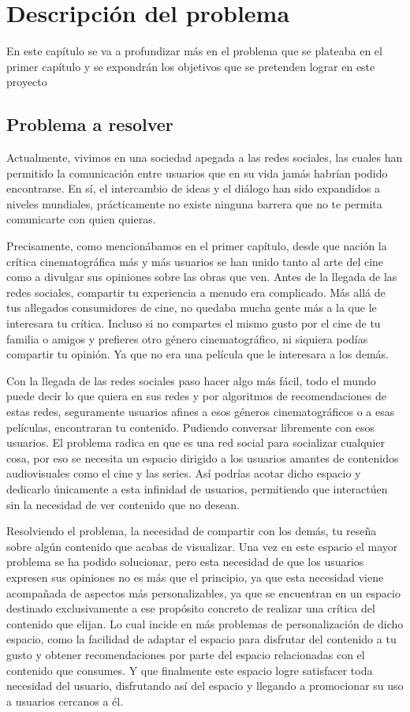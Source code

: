 \chapter{Descripción del problema}

En este capítulo se va a profundizar más en el problema que se plateaba en el primer capítulo y se expondrán los objetivos que se pretenden lograr en este proyecto

\section{Problema a resolver}
Actualmente, vivimos en una sociedad apegada a las redes sociales, las cuales han permitido la comunicación entre usuarios que en su vida jamás habrían podido encontrarse. En sí, el intercambio de ideas y el diálogo han sido expandidos a niveles mundiales, prácticamente no existe ninguna barrera que no te permita comunicarte con quien quieras. 

Precisamente, como mencionábamos en el primer capítulo, desde que nación la crítica cinematográfica más y más usuarios se han unido tanto al arte del cine como a divulgar sus opiniones sobre las obras que ven. Antes de la llegada de las redes sociales, compartir tu experiencia a menudo era complicado. Más allá de tus allegados consumidores de cine, no quedaba mucha gente más a la que le interesara tu crítica. Incluso si no compartes el mismo gusto por el cine de tu familia o amigos y prefieres otro género cinematográfico, ni siquiera podías compartir tu opinión. Ya que no era una película que le interesara a los demás. 

Con la llegada de las redes sociales paso hacer algo más fácil, todo el mundo puede decir lo que quiera en sus redes y por algoritmos de recomendaciones de estas redes, seguramente usuarios afines a esos géneros cinematográficos o a esas películas, encontraran tu contenido. Pudiendo conversar libremente con esos usuarios. El problema radica en que es una red social para socializar cualquier cosa, por eso se necesita un espacio dirigido a los usuarios amantes de contenidos audiovisuales como el cine y las series. Así podrías acotar dicho espacio y dedicarlo únicamente a esta infinidad de usuarios, permitiendo que interactúen sin la necesidad de ver contenido que no desean.

Resolviendo el problema, la necesidad de compartir con los demás, tu reseña sobre algún contenido que acabas de visualizar. Una vez en este espacio el mayor problema se ha podido solucionar, pero esta necesidad de que los usuarios expresen sus opiniones no es más que el principio, ya que esta necesidad viene acompañada de aspectos más personalizables, ya que se encuentran en un espacio destinado exclusivamente a ese propósito concreto de realizar una crítica del contenido que elijan. Lo cual incide en más problemas de personalización de dicho espacio, como la facilidad de adaptar el espacio para disfrutar del contenido a tu gusto y obtener recomendaciones por parte del espacio relacionadas con el contenido que consumes. Y que finalmente este espacio logre satisfacer toda necesidad del usuario, disfrutando así del espacio y llegando a promocionar su uso a usuarios cercanos a él.

